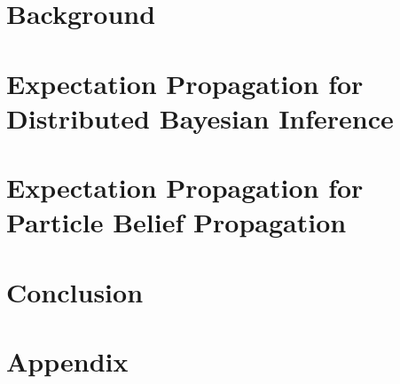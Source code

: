 \chapter{Background}

\ifbgm\fi

\chapter[Expectation Propagation for Distributed Bayesian Inference]{\label{chap:EPforDBI}Expectation Propagation for\\ Distributed Bayesian Inference}
\ifsnep\fi

\chapter[Expectation Propagation for Particle Belief Propagation]{\label{chap:EPBP}Expectation Propagation for\\ Particle Belief Propagation}

\ifpbp\fi


\chapter{Conclusion}

\ifccl\fi



\setcounter{chapter}{0}
\renewcommand{\chaptername}{Paper}
\renewcommand{\thechapter}{\Alph{chapter}}

\chapter{Appendix}





\newpage
\renewcommand{\bibname}{References}

\singlespacing
\begin{small}

\end{small}


